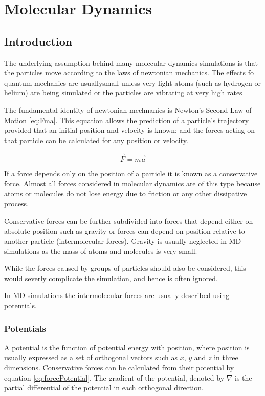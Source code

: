 \documentclass[12pt]{UoAthesis}
\begin{document}

\chapter{Molecular Dynamics} 
\section{Introduction} 

The underlying assumption behind many molecular dynamics simulations
is that the particles move according to the laws of newtonian
mechanics. The effects fo quantum mechanics are usuallysmall unless
very light atoms (such as hydrogen or helium) are being simulated or
the particles are vibrating at very high rates \cite{Frenkel2002}

The fundamental identity of newtonian mechnanics is Newton's Second
Law of Motion \eqref{eq:Fma}. This equation allows the prediction of a
particle's trajectory provided that an initial position and velocity
is known; and the forces acting on that particle can be calculated for
any position or velocity.

\begin{equation}
  \vec{F} = m \vec{a}
  \label{eq:Fma} 
\end{equation}

If a force depends only on the position of a particle it is known as a
conservative force. Almost all forces considered in molecular dynamics
are of this type because atoms or molecules do not lose energy due to
friction or any other dissipative process.

Conservative forces can be further subdivided into forces that depend
either on absolute position such as gravity or forces can depend on
position relative to another particle (intermolecular forces). Gravity
is usually neglected in MD simulations as the mass of atoms and
molecules is very small.


While the forces caused by groups of particles should also be
considered, this would severly complicate the simulation, and hence is
often ignored.

In MD simulations the intermolecular forces are usually described
using potentials.

\subsection{Potentials} 
A potential is the function of potential energy with position, where
position is usually expressed as a set of orthogonal vectors such as
$x$, $y$ and $z$ in three dimensions. Conservative forces can be
calculated from their potential by equation
\ref{eq:forcePotential}. The gradient of the potential, denoted by
$\nabla$ is the partial differential of the potential in each
orthogonal direction.
\end{document}
